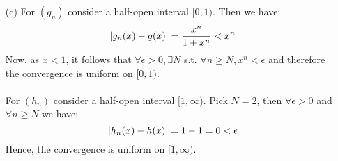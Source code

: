 \documentclass[11pt]{article}
\DeclarePairedDelimiter\abs{\lvert}{\rvert}%
\begin{document}
\begin{itemize}
\begin{itemize}
            \item[(c)]
                For $(g_n)$ consider a half-open interval $[0, 1)$. Then we
                have:
                \begin{equation*}
                    \abs{g_n(x) - g(x)} = \frac{x^n}{1 + x^n} < x^n
                \end{equation*}
                Now, as $x < 1$, it follows that $\forall \epsilon > 0, \exists
                N$ s.t. $\forall n \geq N, x^n < \epsilon$ and therefore the
                convergence is uniform on $[0, 1)$.
                \\
                \\
                For $(h_n)$ consider a half-open interval $[1, \infty)$. Pick
                $N = 2$, then $\forall \epsilon > 0$ and $\forall n \geq N$ we
                have:
                \begin{equation*}
                    \abs{h_n(x) - h(x)} = 1 - 1 = 0 < \epsilon
                \end{equation*}
                Hence, the convergence is uniform on $[1, \infty)$.
        \end{itemize}
    
    \newpage


\end{itemize}
\end{document}
